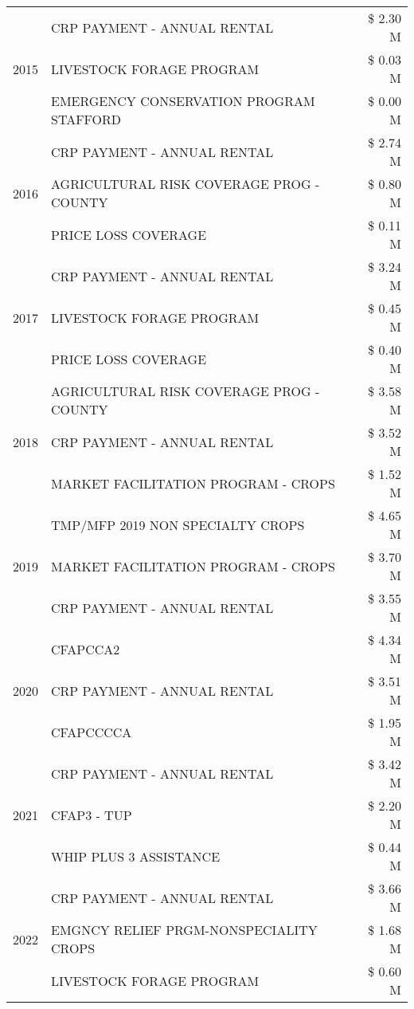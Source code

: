\begin{tabular}{llr}
\cline{1-3}
\multirow[t]{3}{*}{2015} & CRP PAYMENT - ANNUAL RENTAL & \$ 2.30 M \\
 & LIVESTOCK FORAGE PROGRAM & \$ 0.03 M \\
 & EMERGENCY CONSERVATION PROGRAM STAFFORD & \$ 0.00 M \\
\cline{1-3}
\multirow[t]{3}{*}{2016} & CRP PAYMENT - ANNUAL RENTAL & \$ 2.74 M \\
 & AGRICULTURAL RISK COVERAGE PROG - COUNTY & \$ 0.80 M \\
 & PRICE LOSS COVERAGE & \$ 0.11 M \\
\cline{1-3}
\multirow[t]{3}{*}{2017} & CRP PAYMENT - ANNUAL RENTAL & \$ 3.24 M \\
 & LIVESTOCK FORAGE PROGRAM & \$ 0.45 M \\
 & PRICE LOSS COVERAGE & \$ 0.40 M \\
\cline{1-3}
\multirow[t]{3}{*}{2018} & AGRICULTURAL RISK COVERAGE PROG - COUNTY & \$ 3.58 M \\
 & CRP PAYMENT - ANNUAL RENTAL & \$ 3.52 M \\
 & MARKET FACILITATION PROGRAM - CROPS & \$ 1.52 M \\
\cline{1-3}
\multirow[t]{3}{*}{2019} & TMP/MFP 2019 NON SPECIALTY CROPS & \$ 4.65 M \\
 & MARKET FACILITATION PROGRAM - CROPS & \$ 3.70 M \\
 & CRP PAYMENT - ANNUAL RENTAL & \$ 3.55 M \\
\cline{1-3}
\multirow[t]{3}{*}{2020} & CFAPCCA2 & \$ 4.34 M \\
 & CRP PAYMENT - ANNUAL RENTAL & \$ 3.51 M \\
 & CFAPCCCCA & \$ 1.95 M \\
\cline{1-3}
\multirow[t]{3}{*}{2021} & CRP PAYMENT - ANNUAL RENTAL & \$ 3.42 M \\
 & CFAP3 - TUP & \$ 2.20 M \\
 & WHIP PLUS 3 ASSISTANCE & \$ 0.44 M \\
\cline{1-3}
\multirow[t]{3}{*}{2022} & CRP PAYMENT - ANNUAL RENTAL & \$ 3.66 M \\
 & EMGNCY RELIEF PRGM-NONSPECIALITY CROPS & \$ 1.68 M \\
 & LIVESTOCK FORAGE PROGRAM & \$ 0.60 M \\
\cline{1-3}
\bottomrule
\end{tabular}
